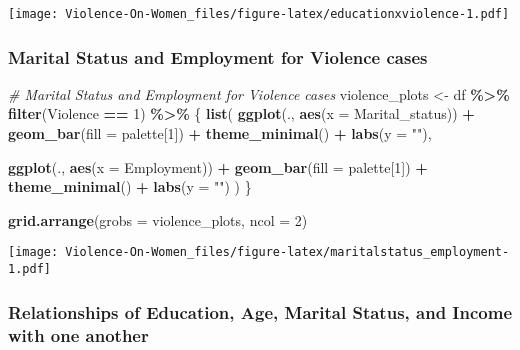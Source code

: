 \documentclass[
]{article}
\newenvironment{Shaded}{\begin{snugshade}}{\end{snugshade}}
\newcommand{\AttributeTok}[1]{\textcolor[rgb]{0.13,0.29,0.53}{#1}}
\newcommand{\CommentTok}[1]{\textcolor[rgb]{0.56,0.35,0.01}{\textit{#1}}}
\newcommand{\DecValTok}[1]{\textcolor[rgb]{0.00,0.00,0.81}{#1}}
\newcommand{\FunctionTok}[1]{\textcolor[rgb]{0.13,0.29,0.53}{\textbf{#1}}}
\newcommand{\NormalTok}[1]{#1}
\newcommand{\OtherTok}[1]{\textcolor[rgb]{0.56,0.35,0.01}{#1}}
\newcommand{\SpecialCharTok}[1]{\textcolor[rgb]{0.81,0.36,0.00}{\textbf{#1}}}
\newcommand{\StringTok}[1]{\textcolor[rgb]{0.31,0.60,0.02}{#1}}
\begin{document}
\texttt{[image: Violence-On-Women\_files/figure-latex/educationxviolence-1.pdf]}

\hypertarget{marital-status-and-employment-for-violence-cases}{%
\subsubsection{Marital Status and Employment for Violence
cases}\label{marital-status-and-employment-for-violence-cases}}

\begin{Shaded}
\begin{Highlighting}[]
\CommentTok{\# Marital Status and Employment for Violence cases}
\NormalTok{violence\_plots }\OtherTok{\textless{}{-}}\NormalTok{ df }\SpecialCharTok{\%\textgreater{}\%}
  \FunctionTok{filter}\NormalTok{(Violence }\SpecialCharTok{==} \DecValTok{1}\NormalTok{) }\SpecialCharTok{\%\textgreater{}\%}
\NormalTok{  \{}
    \FunctionTok{list}\NormalTok{(}
      \FunctionTok{ggplot}\NormalTok{(., }\FunctionTok{aes}\NormalTok{(}\AttributeTok{x =}\NormalTok{ Marital\_status)) }\SpecialCharTok{+}
        \FunctionTok{geom\_bar}\NormalTok{(}\AttributeTok{fill =}\NormalTok{ palette[}\DecValTok{1}\NormalTok{]) }\SpecialCharTok{+}
        \FunctionTok{theme\_minimal}\NormalTok{() }\SpecialCharTok{+}
        \FunctionTok{labs}\NormalTok{(}\AttributeTok{y =} \StringTok{""}\NormalTok{),}
      
      \FunctionTok{ggplot}\NormalTok{(., }\FunctionTok{aes}\NormalTok{(}\AttributeTok{x =}\NormalTok{ Employment)) }\SpecialCharTok{+}
        \FunctionTok{geom\_bar}\NormalTok{(}\AttributeTok{fill =}\NormalTok{ palette[}\DecValTok{1}\NormalTok{]) }\SpecialCharTok{+}
        \FunctionTok{theme\_minimal}\NormalTok{() }\SpecialCharTok{+}
        \FunctionTok{labs}\NormalTok{(}\AttributeTok{y =} \StringTok{""}\NormalTok{)}
\NormalTok{    )}
\NormalTok{  \}}

\FunctionTok{grid.arrange}\NormalTok{(}\AttributeTok{grobs =}\NormalTok{ violence\_plots, }\AttributeTok{ncol =} \DecValTok{2}\NormalTok{)}
\end{Highlighting}
\end{Shaded}

\texttt{[image: Violence-On-Women\_files/figure-latex/maritalstatus\_employment-1.pdf]}

\hypertarget{relationships-of-education-age-marital-status-and-income-with-one-another}{%
\subsubsection{Relationships of Education, Age, Marital Status, and
Income with one
another}\label{relationships-of-education-age-marital-status-and-income-with-one-another}}
\end{document}
